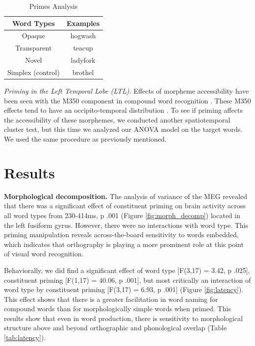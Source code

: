 \documentclass{frontiersSCNS}
\begin{document}
\begin{table}
\centering{}%
\begin{tabular}{|c|c|}
\hline
Word Types & Examples\tabularnewline
\hline
\hline
Opaque & hogwash\tabularnewline
\hline
Transparent & teacup\tabularnewline
\hline
Novel & ladyfork\tabularnewline
\hline
Simplex (control) & brothel\tabularnewline
\hline
\end{tabular}\caption{\label{tab:Primes-Analysis} Primes Analysis}
\end{table}

\textit{Priming in the Left Temporal Lobe (LTL).} Effects of morpheme accessibility have been seen with the M350 component in compound word recognition \citep{Fiorentino:2007}. These M350 effects tend to have an occipito-temporal distribution \cite{Pylkkanen:2003}. To see if priming affects the accessibility of these morphemes, we conducted another spatiotemporal cluster test, but this time we analyzed our ANOVA model on the target words. We used the same procedure as previously mentioned.

\section{Results}
 
\textbf{Morphological decomposition.} The analysis of variance of the MEG revealed that there was a significant effect of constituent priming on brain activity across all word types from 230-414ms, p \lessthan .001 (Figure \ref{fig:morph_decomp}) located in the left fusiform gyrus. However, there were no interactions with word type. This priming manipulation reveals across-the-board sensitivity to words embedded, which indicates that orthography is playing a more prominent role at this point of visual word recognition.

Behaviorally, we did find a significant effect of word type [F(3,17) = 3.42, p \lessthan .025], constituent priming [F(1,17) = 40.06, p \lessthan .001], but most critically an interaction of word type by constituent priming [F(3,17) = 6.93, p \lessthan .001] (Figure \ref{fig:latency}). This effect shows that there is a greater facilitation in word naming for compound words than for morphologically simple words when primed. This results show that even in word production, there is sensitivity to morphological structure above and beyond orthographic and phonological overlap (Table \ref{tab:latency}). 
\end{document}
